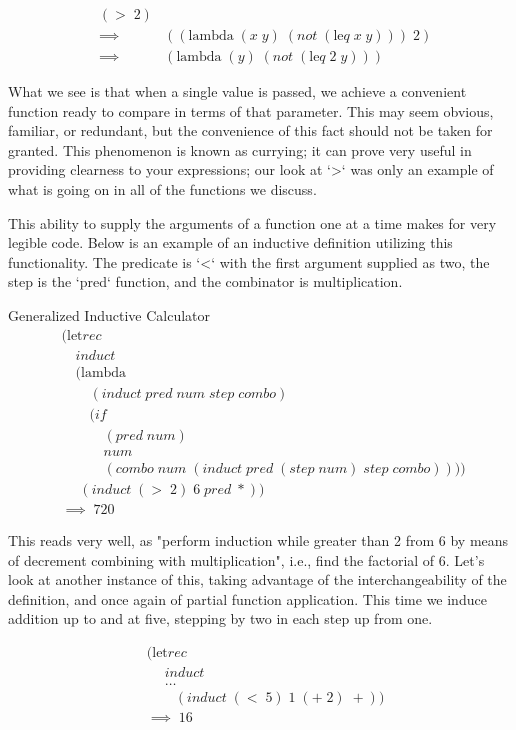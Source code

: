\begin{align*}
& (> \; 2)
\\& \implies \; &((\text{lambda} \; (x \; y) \; (not \; (\text{le}q \; x \; y))) \; 2)
\\& \implies \; &(\text{lambda} \; (y) \; (not \; (\text{le}q \; 2 \; y))) \; 
\end{align*}

What we see is that when a single value is passed, we achieve a convenient 
function ready to compare in terms of that parameter. This may seem obvious, 
familiar, or redundant, but the convenience of this fact should not be taken for 
granted. This phenomenon is known as currying; it can prove very useful in 
providing clearness to your expressions; our look at `>` was only an example of 
what is going on in all of the functions we discuss.

This ability to supply the arguments of a function one at a time makes for very 
legible code. Below is an example of an inductive definition utilizing this 
functionality. The predicate is `<` with the first argument supplied as two, the 
step is the `pred` function, and the combinator is multiplication.

Generalized Inductive Calculator
\begin{align*}
& (\text{let}rec \; 
\\& \quad induct \; 
\\& \quad (\text{lambda} \; 
\\& \qquad (induct \; pred \; num \; step \; combo) \; 
\\& \qquad (if \; 
\\& \qquad \quad (pred \; num) \; 
\\& \qquad \quad num \; 
\\& \qquad \quad (combo \; num \; (induct \; pred \; (step \; num) \; step \; combo)))) \; 
\\& \quad \; (induct \; (> \; 2) \; 6 \; pred \; *))
\\& \implies \; 720
\end{align*}

This reads very well, as "perform induction while greater than 2 from 6 by means 
of decrement combining with multiplication", i.e., find the factorial of 6. Let's 
look at another instance of this, taking advantage of the interchangeability of 
the definition, and once again of partial function application. This time we 
induce addition up to and at five, stepping by two in each step up from one.

\begin{align*}
& (\text{let}rec \; 
\\& \quad \; induct \; 
\\& \quad \; \dots
\\& \qquad (induct \; (< \; 5) \; 1 \; (+ \; 2) \; +))
\\& \implies \; 16
\end{align*}

